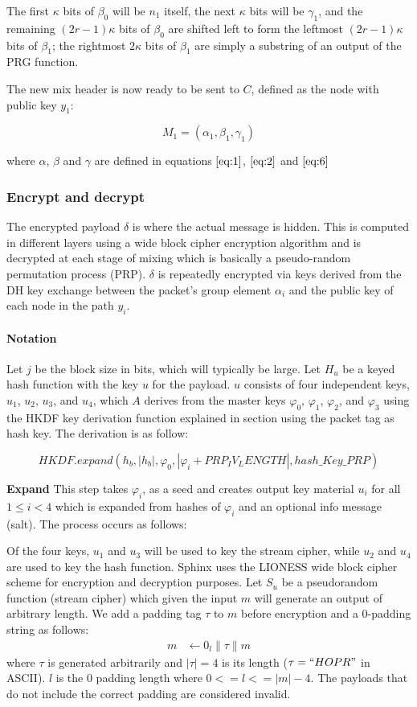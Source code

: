 The first $\kappa$ bits of $\beta_0$ will be $n_{1}$ itself, the next $\kappa$ bits will be $\gamma_{1}$, and the remaining $(2r-1)\kappa$ bits of $\beta_0$ are shifted left to form the leftmost $(2r-1)\kappa$ bits of $\beta_{1}$; the rightmost $2\kappa$ bits of $\beta_{1}$ are simply a substring of an output of the PRG function.

The new mix header is now ready to be sent to $C$, defined as the node with public key $y_1$:

$$M_1=(\alpha_1,\beta_1,\gamma_1)$$

where $\alpha$, $\beta$ and $\gamma$ are defined in equations $\ref{eq:1}$, $\ref{eq:2}$ and $\ref{eq:6}$

\subsubsection{Encrypt and decrypt}
The encrypted payload $\delta$ is where the actual message is hidden. This is computed in different layers using a wide block cipher encryption algorithm and is decrypted at each stage of mixing which is basically a pseudo-random permutation process (PRP). $\delta$ is repeatedly encrypted via keys derived from the DH key exchange between the packet’s group element $\alpha_i$ and the public key of each node in the path $y_i$.

\paragraph{Notation}
Let $j$ be the block size in bits, which will typically be large. Let $H_u$ be a keyed hash function with the key $u$ for the payload. $u$ consists of four independent keys, $u_1$, $u_2$, $u_3$, and $u_4$, which $A$ derives from the master keys $\varphi_0$, $\varphi_1$, $\varphi_2$, and $\varphi_3$ using the HKDF key derivation function explained in  section using the packet tag as hash key. The derivation is as follow:

$$HKDF.expand(h_b, |h_b|,\varphi_0, |\varphi_i + PRP_IV_LENGTH|, hash\_Key\_PRP)$$


\textbf{Expand} This step takes $\varphi_i$, as a seed and creates output key material $u_i$ for all $1\le i < 4 $ which is expanded from hashes of $\varphi_i$ and an optional info message (salt). The process occurs as follows:

Of the four keys, $u_1$ and $u_3$ will be used to key the stream cipher, while $u_2$ and $u_4$ are used to key the hash function. Sphinx uses the LIONESS wide block cipher scheme for encryption and decryption purposes. Let $S_u$ be a pseudorandom function (stream cipher) which given the input $m$ will generate an output of arbitrary length. We add a padding tag $\tau$ to $m$ before encryption and a 0-padding string as follows:
\begin{align}
   m &\leftarrow 0_{l} \|\tau\|m
\end{align}
where $\tau$ is generated arbitrarily and $|\tau|=4$ is its length ($\tau=``HOPR "$ in ASCII). $l$ is the $0$ padding length where
$0 <= l <= |m| - 4$. The payloads that do not include the correct padding are considered invalid.

